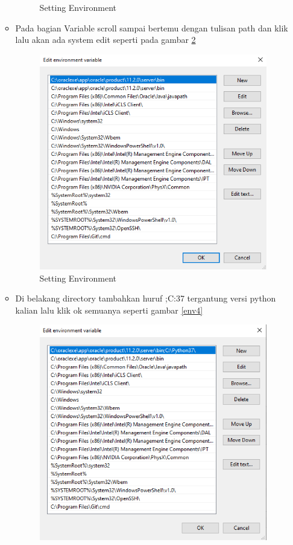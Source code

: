 \begin{enumerate}
\begin{itemize}
\begin{figure}[!htbp]
    \caption{Setting Environment}
    \label{env2}
    \end{figure}
    \item Pada bagian Variable scroll sampai bertemu dengan tulisan path dan klik lalu akan ada system edit seperti pada gambar \ref{env3}
        \begin{figure}[!htbp]
    \centering 
    \includegraphics[scale=0.6]{figures/env3.PNG} 
    \caption{Setting Environment}
    \label{env3}
    \end{figure}
    \item Di belakang directory tambahkan huruf ;C:37 tergantung versi python kalian lalu klik ok semuanya seperti gambar \ref{env4}
        \begin{figure}[!htbp]
    \centering 
    \includegraphics[scale=0.7]{figures/env4.PNG} 

\end{figure}
\end{itemize}
\end{enumerate}
